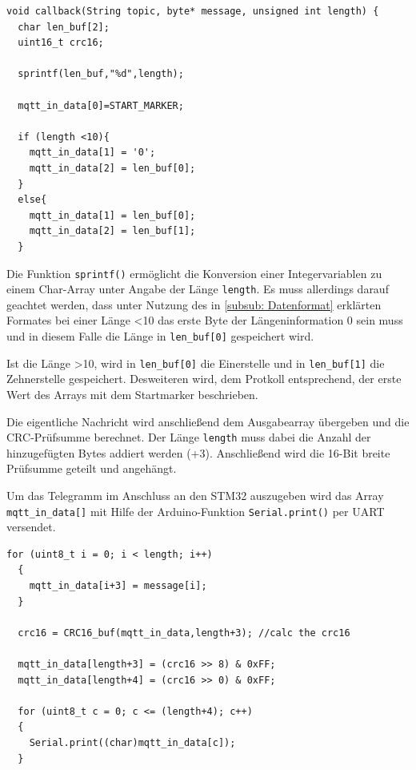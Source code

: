 \begin{lstlisting}[caption={\textit{Längenkonversion}}]
  void callback(String topic, byte* message, unsigned int length) {
  char len_buf[2];
  uint16_t crc16;

  sprintf(len_buf,"%d",length); 

  mqtt_in_data[0]=START_MARKER; 

  if (length <10){
    mqtt_in_data[1] = '0';
    mqtt_in_data[2] = len_buf[0];
  }
  else{
    mqtt_in_data[1] = len_buf[0];
    mqtt_in_data[2] = len_buf[1];
  }
\end{lstlisting}

Die Funktion \lstinline!sprintf()! ermöglicht die Konversion einer Integervariablen zu einem Char-Array unter Angabe der Länge \lstinline!length!.
Es muss allerdings darauf geachtet werden, dass unter Nutzung des in \ref{subsub: Datenformat} erklärten Formates bei einer Länge <10
das erste Byte der Längeninformation 0 sein muss und in diesem Falle die Länge in \lstinline!len_buf[0]! gespeichert wird.

Ist die Länge >10, wird in \lstinline!len_buf[0]! die Einerstelle und in \lstinline!len_buf[1]! die Zehnerstelle gespeichert. Desweiteren wird, 
dem Protkoll entsprechend, der erste Wert des Arrays mit dem Startmarker beschrieben.

\smallskip

Die eigentliche Nachricht wird anschließend dem Ausgabearray übergeben und die CRC-Prüfsumme berechnet. Der Länge \lstinline!length!
muss dabei die Anzahl der hinzugefügten Bytes addiert werden (+3). Anschließend wird die 16-Bit breite Prüfsumme geteilt und angehängt.


Um das Telegramm im Anschluss an den STM32 auszugeben wird das Array \lstinline!mqtt_in_data[]! mit Hilfe der Arduino-Funktion \lstinline!Serial.print()!
per \ac{UART} versendet.

\newpage

\begin{lstlisting}[caption={\textit{Ausgabe MQTT-Nachricht}}]
  for (uint8_t i = 0; i < length; i++)   
  {
    mqtt_in_data[i+3] = message[i];
  }

  crc16 = CRC16_buf(mqtt_in_data,length+3); //calc the crc16

  mqtt_in_data[length+3] = (crc16 >> 8) & 0xFF; 
  mqtt_in_data[length+4] = (crc16 >> 0) & 0xFF;

  for (uint8_t c = 0; c <= (length+4); c++)
  {
    Serial.print((char)mqtt_in_data[c]);        
  }

\end{lstlisting}